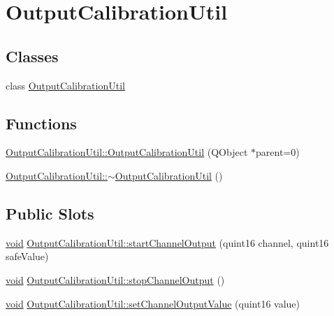 \hypertarget{group___output_calibration_util}{\section{\-Output\-Calibration\-Util}
\label{group___output_calibration_util}
}
\subsection*{\-Classes}
\begin{DoxyCompactItemize}
\item 
class \hyperlink{class_output_calibration_util}{\-Output\-Calibration\-Util}
\end{DoxyCompactItemize}
\subsection*{\-Functions}
\begin{DoxyCompactItemize}
\item 
\hyperlink{group___output_calibration_util_gad4fa78a9ae7280d3f4476614ab1b75bc}{\-Output\-Calibration\-Util\-::\-Output\-Calibration\-Util} (\-Q\-Object $\ast$parent=0)
\item 
\hyperlink{group___output_calibration_util_gabc2baa99b6831e09b1a481dbdcae92ab}{\-Output\-Calibration\-Util\-::$\sim$\-Output\-Calibration\-Util} ()
\end{DoxyCompactItemize}
\subsection*{\-Public \-Slots}
\begin{DoxyCompactItemize}
\item 
\hyperlink{group___u_a_v_objects_plugin_ga444cf2ff3f0ecbe028adce838d373f5c}{void} \hyperlink{group___output_calibration_util_ga4e257b02b35e22c737c50cbeab039173}{\-Output\-Calibration\-Util\-::start\-Channel\-Output} (quint16 channel, quint16 safe\-Value)
\item 
\hyperlink{group___u_a_v_objects_plugin_ga444cf2ff3f0ecbe028adce838d373f5c}{void} \hyperlink{group___output_calibration_util_ga82c5762c4c3caeebb767eff46035ba59}{\-Output\-Calibration\-Util\-::stop\-Channel\-Output} ()
\item 
\hyperlink{group___u_a_v_objects_plugin_ga444cf2ff3f0ecbe028adce838d373f5c}{void} \hyperlink{group___output_calibration_util_gae8a819e164b2c70af5e6e884ffea3519}{\-Output\-Calibration\-Util\-::set\-Channel\-Output\-Value} (quint16 value)
\end{DoxyCompactItemize}


